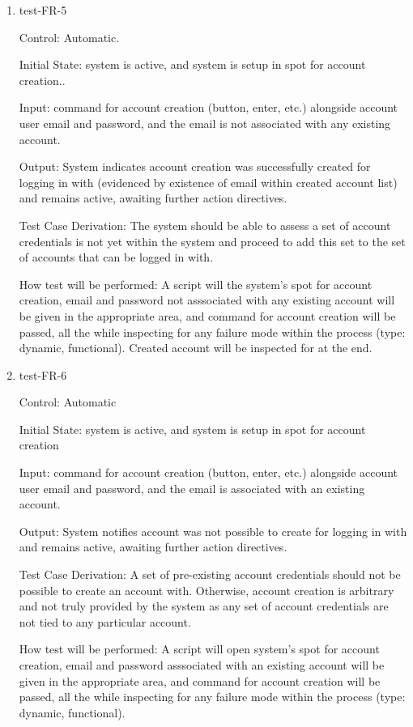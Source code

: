 \documentclass[12pt, titlepage]{article}
\begin{document}
\begin{enumerate}

\item{test-FR-5\\}

Control: Automatic.
					
Initial State: system is active, and system is setup in spot for account 
creation..
					
Input: command for account creation (button, enter, etc.) alongside account 
user email and password, and the email is not associated with any existing 
account.
					
Output: System indicates account creation was successfully created for 
logging in with (evidenced by existence of email within created account list)
and remains active, awaiting further action directives.

Test Case Derivation: The system should be able to assess a set of account 
credentials is not yet within the system and proceed to add this set to the 
set of accounts that can be logged in with.

How test will be performed: A script will the system's spot for account creation, 
email and password not asssociated with any existing account will be given in the 
appropriate area, and command for account creation will be passed, all the while inspecting 
for any failure mode within the process (type: dynamic, functional). Created account
will be inspected for at the end.

\item{test-FR-6\\}

Control: Automatic
					
Initial State: system is active, and system is setup in spot for account creation
					
Input: command for account creation (button, enter, etc.) alongside account 
user email and password, and the email is associated with an existing 
account.
					
Output: System notifies account was not possible to create for logging 
in with and remains active, awaiting further action directives.

Test Case Derivation: A set of pre-existing account credentials should not be 
possible to create an account with. Otherwise, account creation is arbitrary 
and not truly provided by the system as any set of account credentials are not 
tied to any particular account.

How test will be performed: A script will open system's spot for account 
creation, email and password asssociated with an existing account will be 
given in the appropriate area, and command for account creation will be 
passed, all the while inspecting for any failure mode within the process 
(type: dynamic, functional).
					

\end{enumerate}
\end{document}
